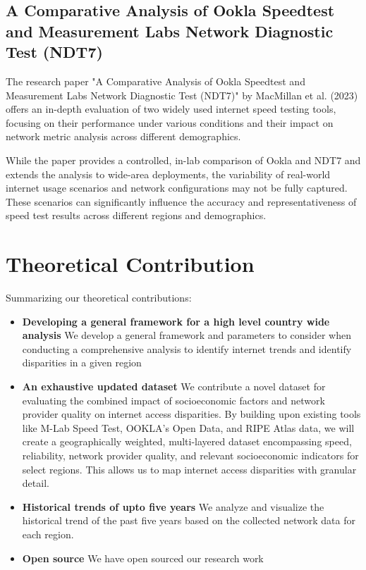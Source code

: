 \documentclass[conference]{IEEEtran}
\begin{document}
\subsection{\textbf{A Comparative Analysis of Ookla Speedtest and Measurement Labs Network Diagnostic Test (NDT7) \cite{6}}}
The research paper "A Comparative Analysis of Ookla Speedtest and Measurement Labs Network Diagnostic Test (NDT7)" by MacMillan et al. (2023) offers an in-depth evaluation of two widely used internet speed testing tools, focusing on their performance under various conditions and their impact on network metric analysis across different demographics.

While the paper provides a controlled, in-lab comparison of Ookla and NDT7 and extends the analysis to wide-area deployments, the variability of real-world internet usage scenarios and network configurations may not be fully captured. These scenarios can significantly influence the accuracy and representativeness of speed test results across different regions and demographics.


\section{Theoretical Contribution}

Summarizing our theoretical contributions:

\begin{itemize}
\item \textbf{Developing a general framework for a high level country wide analysis} We develop a general framework and
parameters to consider when conducting a comprehensive analysis to identify internet trends and identify disparities
in a given region
\item \textbf{An exhaustive updated dataset} We contribute a novel dataset for evaluating the combined impact of socioeconomic factors and network provider quality on internet access disparities. By building upon existing tools like M-Lab Speed Test, OOKLA's Open Data, and RIPE Atlas data, we will create a geographically weighted, multi-layered dataset encompassing speed, reliability, network provider quality, and relevant socioeconomic indicators for select regions. This allows us to map internet access disparities with granular detail.
\item \textbf{Historical trends of upto five years} We analyze and visualize the historical trend of the past five years based on the collected network data for each region.
\item \textbf{Open source} We have open sourced our research work \cite{9}
\end{itemize}
\end{document}
